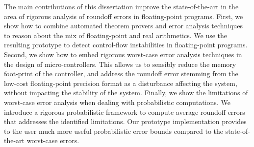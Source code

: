 The main contributions of this dissertation improve the state-of-the-art in the area of rigorous analysis of roundoff errors in floating-point programs.
%
First, we show how to combine automated theorem provers and error analysis techniques to reason about the mix of floating-point and real arithmetics.
%
We use the resulting prototype to detect control-flow instabilities in floating-point programs.
%
Second, we show how to embed rigorous worst-case error analysis techniques in the design of micro-controllers.
%
This allows us to sensibly reduce the memory foot-print of the controller, and address the roundoff error stemming from the low-cost floating-point precision format as a disturbance affecting the system, without impacting the stability of the system.
%
Finally, we show the limitations of worst-case error analysis when dealing with probabilistic computations. 
%
We introduce a rigorous probabilistic framework to compute average roundoff errors that addresses the identified limitations.
%
Our prototype implementation provides to the user much more useful probabilistic error bounds compared to the state-of-the-art worst-case errors.